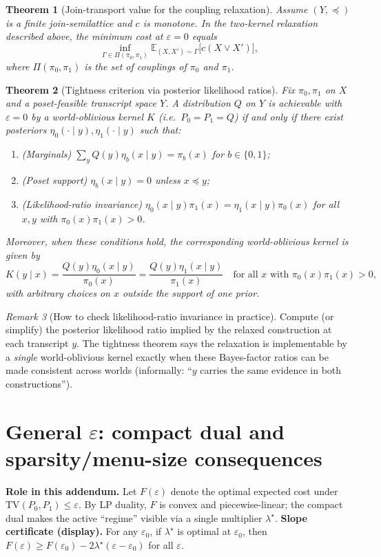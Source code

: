 \documentclass[11pt]{article}
\newtheorem{theorem}{Theorem}
\theoremstyle{definition}
\theoremstyle{remark}
\newtheorem{remark}[theorem]{Remark}
\newcommand{\TV}{\mathrm{TV}}
\newcommand{\E}{\mathbb{E}}
\begin{document}
\begin{theorem}[Join-transport value for the coupling relaxation]\label{thm:jointransport_relax}
Assume \((Y,\preceq)\) is a finite join-semilattice and \(c\) is monotone.
In the two-kernel relaxation described above, the minimum cost at \(\varepsilon=0\) equals
\[
\inf_{\Gamma\in \Pi(\pi_0,\pi_1)} \E_{(X,X')\sim \Gamma}\big[c(X\vee X')\big],
\]
where \(\Pi(\pi_0,\pi_1)\) is the set of couplings of \(\pi_0\) and \(\pi_1\).
\end{theorem}

\begin{theorem}[Tightness criterion via posterior likelihood ratios]\label{thm:tightness}
Fix \(\pi_0,\pi_1\) on \(X\) and a poset-feasible transcript space \(Y\).
A distribution \(Q\) on \(Y\) is achievable with \(\varepsilon=0\) by a world-oblivious kernel \(K\) (i.e.\ \(P_0=P_1=Q\))
if and only if there exist posteriors \(\eta_0(\cdot\mid y),\eta_1(\cdot\mid y)\) such that:
\begin{enumerate}
\item (Marginals) \(\sum_y Q(y)\eta_b(x\mid y)=\pi_b(x)\) for \(b\in\{0,1\}\);
\item (Poset support) \(\eta_b(x\mid y)=0\) unless \(x\preceq y\);
\item (Likelihood-ratio invariance) \(\eta_0(x\mid y)\pi_1(x)=\eta_1(x\mid y)\pi_0(x)\) for all \(x,y\) with \(\pi_0(x)\pi_1(x)>0\).
\end{enumerate}
Moreover, when these conditions hold, the corresponding world-oblivious kernel is given by
\[
K(y\mid x)=\frac{Q(y)\eta_0(x\mid y)}{\pi_0(x)}=\frac{Q(y)\eta_1(x\mid y)}{\pi_1(x)}
\quad\text{for all }x\text{ with }\pi_0(x)\pi_1(x)>0,
\]
with arbitrary choices on \(x\) outside the support of one prior.
\end{theorem}

\begin{remark}[How to check likelihood-ratio invariance in practice]
Compute (or simplify) the posterior likelihood ratio implied by the relaxed construction at each transcript $y$.
The tightness theorem says the relaxation is implementable by a \emph{single} world-oblivious kernel exactly when these Bayes-factor ratios can be made consistent across worlds (informally: ``$y$ carries the same evidence in both constructions'').
\end{remark}


\section[General epsilon: compact dual and sparsity]{General $\varepsilon$: compact dual and sparsity/menu-size consequences}
\noindent\textbf{Role in this addendum.} Let $F(\varepsilon)$ denote the optimal expected cost under $\TV(P_0,P_1)\le \varepsilon$. By LP duality, $F$ is convex and piecewise-linear; the compact dual makes the active ``regime'' visible via a single multiplier $\lambda^\star$.
\vspace{0.25em}
\noindent\textbf{Slope certificate (display).} For any $\varepsilon_0$, if $\lambda^\star$ is optimal at $\varepsilon_0$, then $F(\varepsilon)\ge F(\varepsilon_0)-2\lambda^\star(\varepsilon-\varepsilon_0)$ for all $\varepsilon$.
\end{document}
